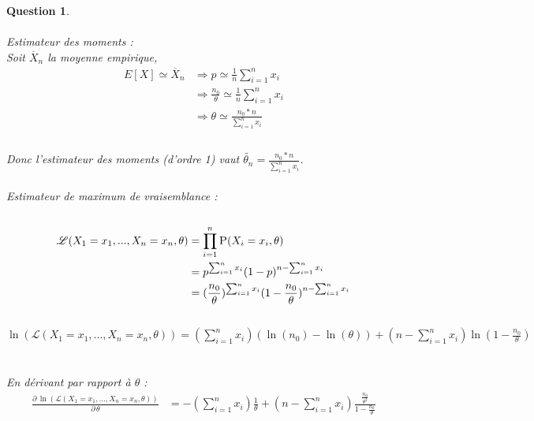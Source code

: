 \documentclass[a4paper,11pt]{article}
\newtheorem{exo1}{Question}
\begin{document}
\begin{exo1} \ \\ \\
Estimateur des moments : \ \\
Soit $\overline{X}_n$ la moyenne empirique, \ \\
\begin{equation}
\begin{aligned}
E[X] \simeq \overline{X}_n & \Rightarrow p \simeq \frac{1}{n}\sum_{i=1}^{n} x_{i} \ \\
& \Rightarrow \frac{n_{0}}{\theta} \simeq \frac{1}{n}\sum_{i=1}^{n} x_{i} \ \\
& \Rightarrow \theta \simeq \frac{n_{0}*n}{\sum_{i=1}^{n} x_{i}} \ \\
\end{aligned}
\end{equation} \ \\
Donc l'estimateur des moments (d'ordre 1) vaut $\tilde{\theta_{n}}=\frac{n_{0}*n}{\sum_{i=1}^{n} x_{i}}$. \ \\ \\
Estimateur de maximum de vraisemblance : \ \\ \\
\begin{equation}
\begin{aligned}
\mathscr{L}(X_{1}=x_{1},...,X_{n}=x_{n}, \theta) & = \prod_{i=1}^{n}\textsc{P}(X_{i}=x_{i}, \theta) \ \\
& = p^{\sum_{i=1}^{n} x_{i}}(1-p)^{n-\sum_{i=1}^{n} x_{i}} \ \\ 
& = (\frac{n_{0}}{\theta})^{\sum_{i=1}^{n}
x_{i}}(1-\frac{n_{0}}{\theta})^{n-\sum_{i=1}^{n} x_{i}} \ \\
\end{aligned}
\end{equation} \ \\
$\ln(\mathscr{L}(X_{1}=x_{1},...,X_{n}=x_{n}, \theta)) = (\sum\limits_{i=1}^{n}x_{i})(\ln(n_{0})-\ln(\theta))+(n-\sum\limits_{i=1}^{n} x_{i})\ln(1-\frac{n_{0}}{\theta})$ \ \\ \\
En dérivant par rapport à $\theta$ : \ \\
\begin{equation}
\begin{aligned}
\frac{\partial\,\ln(\mathscr{L}(X_{1}=x_{1},...,X_{n}=x_{n}, \theta))}{\partial\,\theta} & = -(\sum_{i=1}^{n} x_{i})\frac{1}{\theta}+(n-\sum_{i=1}^{n} x_{i})\frac{\frac{n_{0}}{\theta^{2}}}{1-\frac{n_{0}}{\theta}} \ \\

\end{aligned}
\end{equation}
\end{exo1}
\end{document}
